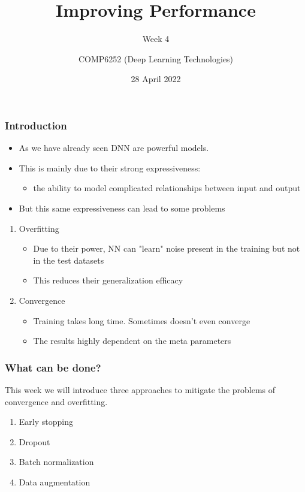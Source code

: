\documentclass{beamer}
\begin{document}
\title{Improving Performance}
\subtitle{Week 4}
\author{COMP6252 (Deep Learning Technologies)}
 \date{28 April 2022}

\begin{frame}
    \placelogofalse %
    \titlepage
\end{frame}
    
\placelogotrue

    
\renewcommand{\figurename}{From}
\begin{frame}
    \frametitle{Introduction}
\begin{itemize}
    \item As we have already  seen DNN are powerful models.
    \item This is mainly due to their strong expressiveness: 
    \begin{itemize}
        \item  the ability to model complicated relationships between input and output
    \end{itemize}
   
    \item But this same expressiveness can lead to some problems
\end{itemize}
    \begin{enumerate}
        \item Overfitting
        \begin{itemize}
            \item Due to their power, NN can "learn" noise present in the training but not in the test datasets 
            \item This reduces their generalization efficacy
        \end{itemize}
        \item Convergence 
        \begin{itemize}
            \item Training takes long time. Sometimes doesn't even converge
            \item The results highly dependent on the meta parameters 
        \end{itemize}
    \end{enumerate}

\end{frame}
\begin{frame}
    \frametitle{What can be done?}
    This week we will introduce three approaches to mitigate the problems of convergence and overfitting.

    \begin{enumerate}
        \item Early stopping
        \item Dropout
        \item Batch normalization 
        \item Data augmentation
    \end{enumerate}
\end{frame}
\end{document}
